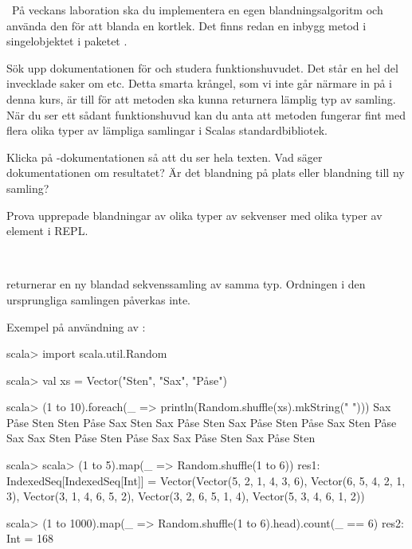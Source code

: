 
\QUESTBEGIN

\Task \what~På veckans laboration ska du implementera en egen blandningsalgoritm och använda den för att blanda en kortlek. Det finns redan en inbygg metod  i singelobjektet  i paketet .

\Subtask Sök upp dokumentationen för  och studera funktionshuvudet. Det står en hel del invecklade saker om  etc. Detta smarta krångel, som vi inte går närmare in på i denna kurs, är till för att metoden ska kunna returnera lämplig typ av samling. När du ser ett sådant funktionshuvud kan du anta att metoden fungerar fint med flera olika typer av lämpliga samlingar i Scalas standardbibliotek.

Klicka på -dokumentationen så att du ser hela texten. Vad säger dokumentationen om resultatet? Är det blandning på plats eller blandning till ny samling?

\Subtask Prova upprepade blandningar av olika typer av sekvenser med olika typer av element i REPL.

\SOLUTION

\TaskSolved \what~

\SubtaskSolved {} returnerar en ny blandad sekvenssamling av samma typ. Ordningen i den ursprungliga samlingen påverkas inte.

\SubtaskSolved Exempel på användning av :
\begin{REPL}
scala> import scala.util.Random

scala> val xs = Vector("Sten", "Sax", "Påse")

scala> (1 to 10).foreach(_ => println(Random.shuffle(xs).mkString(" ")))
Sax Påse Sten
Sten Påse Sax
Sten Sax Påse
Sten Sax Påse
Sten Påse Sax
Sten Påse Sax
Sax Sten Påse
Sten Påse Sax
Sax Påse Sten
Sax Påse Sten

scala> scala> (1 to 5).map(_ => Random.shuffle(1 to 6))
res1: IndexedSeq[IndexedSeq[Int]] =
  Vector(Vector(5, 2, 1, 4, 3, 6), Vector(6, 5, 4, 2, 1, 3),
  Vector(3, 1, 4, 6, 5, 2), Vector(3, 2, 6, 5, 1, 4),
  Vector(5, 3, 4, 6, 1, 2))

scala> (1 to 1000).map(_ => Random.shuffle(1 to 6).head).count(_ == 6)
res2: Int = 168
\end{REPL}


\QUESTEND



